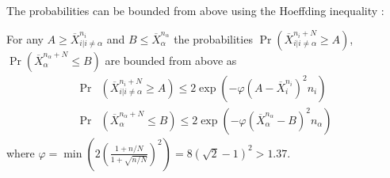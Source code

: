 The probabilities can be bounded from above using the
Hoeffding inequality \cite{Hoeffding.ineq}:
\begin{thm} For any $A\ge\overline X_{i|i\ne\alpha}^{n_i}$ and $B\le\overline X_\alpha^{n_\alpha}$ the probabilities $\Pr(\overline X_{i|i\ne\alpha}^{n_i+N} \ge A)$, $\Pr(\overline X_\alpha^{{n_\alpha}+N} \le B)$ are bounded from above as
\begin{align}
  \label{eqn:mcts-probound-blnk-hoeffding}
  \Pr&(\overline X_{i|i\ne\alpha}^{n_i+N} \ge A) \le 2\exp\left(- \varphi (A -\overline  X_i^{n_i})^2 n_i \right)\nonumber\\
  \Pr&(\overline X_\alpha^{{n_\alpha}+N} \le B) \le 2\exp\left(- \varphi (\overline X_\alpha^{n_\alpha} - B)^2 n_\alpha\right)
\end{align}
where $\varphi=\min \left(2(\frac {1+n/N} {1+\sqrt {n/N}})^2\right)=8(\sqrt 2 - 1)^2 > 1.37$.
\label{thm:mcts-hoeffding-prob-bounds}
\end{thm}



